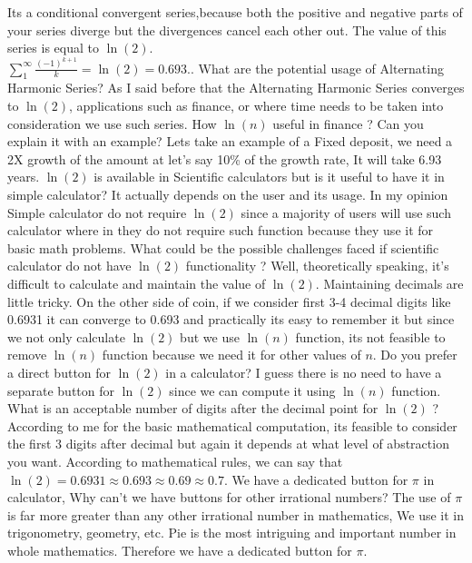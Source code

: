 \documentclass{article}
\begin{document}
\begin{description}
Its a conditional convergent series,because both the positive and negative parts of your series diverge but the divergences cancel each other out. The value of this series is equal to $\ln(2)$. \\
$\sum_1^\infty{\frac{(-1)^{k+1}}{k}} = \ln(2) = 0.693..$
\me What are the potential usage of Alternating Harmonic Series?
\prof As I said before that the Alternating Harmonic Series converges to $\ln(2)$, applications such as finance, or where time needs to be taken into consideration we use such series.
\me How $\ln(n)$ useful in finance ? Can you explain it with an example?
\prof Lets take an example of a Fixed deposit, we need a 2X growth of the amount at let's say 10\% of the growth rate, It will take 6.93 years.
\me $\ln(2)$ is available in Scientific calculators but is it useful to have it in simple calculator?
\prof It actually depends on the user and its usage. In my opinion Simple calculator do not require $\ln(2)$ since a majority of users will use such calculator where in they do not require such function because they use it for basic math problems.
\me What could be the possible challenges faced if scientific calculator do not have $\ln(2)$ functionality ?
\prof Well, theoretically speaking, it's difficult to calculate and maintain the value of $\ln(2)$. Maintaining decimals are little tricky. On the other side of coin, if we consider first 3-4 decimal digits like 0.6931 it can converge to 0.693 and practically its easy to remember it but since we not only calculate $\ln(2)$ but we use $\ln(n)$ function, its not feasible to remove $\ln(n)$ function because we need it for other values of $n$.
\newpage
\me Do you prefer a direct button for $\ln(2)$ in a calculator?
\prof I guess there is no need to have a separate button for $\ln(2)$ since we can compute it using $\ln(n)$ function.
\me What is an acceptable number of digits after the decimal point for $\ln(2)$ ?
\prof According to me for the basic mathematical computation, its feasible to consider the first 3 digits after decimal but again it depends at what level of abstraction you want. According to mathematical rules, we can say that $\ln(2) = 0.6931 \approx 0.693 \approx 0.69 \approx 0.7$.
\me We have a dedicated button for $\pi$ in calculator, Why can't we have buttons for other irrational numbers?
\prof The use of $\pi$ is far more greater than any other irrational number in mathematics, We use it in trigonometry, geometry, etc. Pie is the most intriguing and important number in whole mathematics. Therefore we have a dedicated button for $\pi$.
\end{description}
\end{document}
